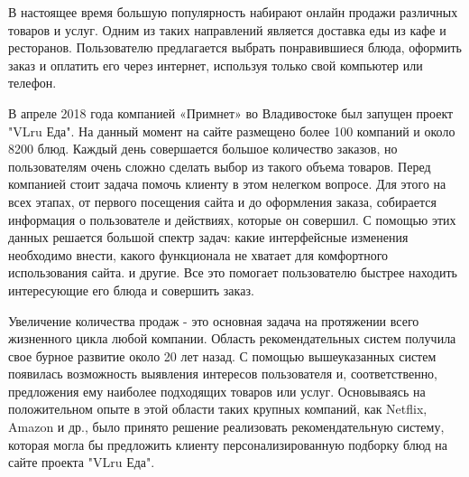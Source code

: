В настоящее время большую популярность набирают онлайн продажи различных товаров
и услуг. Одним из таких направлений является доставка еды из кафе и ресторанов.
Пользователю предлагается выбрать понравившиеся блюда, оформить заказ и оплатить
его через интернет, используя только свой компьютер или телефон.

В апреле 2018 года компанией «Примнет» во Владивостоке был запущен проект "VLru Еда".
На данный момент на сайте размещено более 100 компаний и около 8200 блюд. Каждый
день совершается большое количество заказов, но пользователям очень сложно сделать
выбор из такого объема товаров. Перед компанией стоит задача помочь клиенту в этом
нелегком вопросе. Для этого на всех этапах, от первого посещения сайта и до
оформления заказа, собирается информация о пользователе и действиях, которые он
совершил. С помощью этих данных решается большой спектр задач: какие интерфейсные
изменения необходимо внести, какого функционала не хватает для комфортного
использования сайта. и другие. Все это помогает пользователю быстрее находить интересующие
его блюда и совершить заказ.

Увеличение количества продаж - это основная задача на протяжении всего жизненного
цикла любой компании. Область рекомендательных систем получила свое бурное развитие
около 20 лет назад. С помощью вышеуказанных систем появилась возможность выявления
интересов пользователя и, соответственно, предложения ему наиболее подходящих
товаров или услуг. Основываясь на положительном опыте в этой области таких крупных
компаний, как Netflix, Amazon и др., было принято решение реализовать рекомендательную
систему, которая могла бы предложить клиенту персонализированную подборку блюд на
сайте проекта "VLru Еда".
